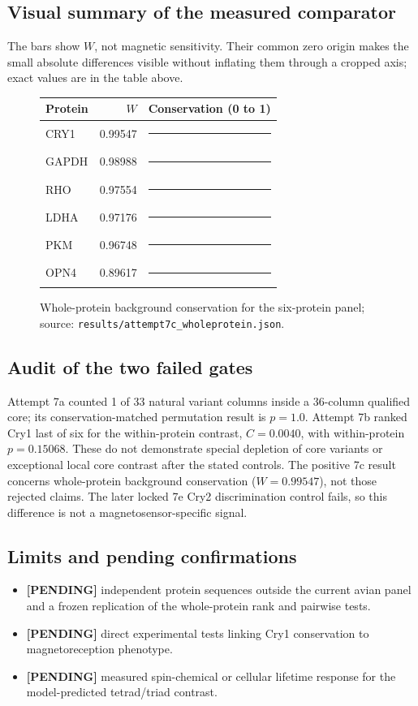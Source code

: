 \subsection{Visual summary of the measured comparator}
The bars show $W$, not magnetic sensitivity. Their common zero origin makes the small absolute differences visible without inflating them through a cropped axis; exact values are in the table above.
\begin{figure}[ht]\centering\small\begin{tabular}{lr l}\hline Protein & $W$ & Conservation (0 to 1) \\\hline
CRY1 & 0.99547 & \textcolor{paperblue}{\rule{7.27cm}{5pt}} \\
GAPDH & 0.98988 & \textcolor{black}{\rule{7.23cm}{5pt}} \\
RHO & 0.97554 & \textcolor{black}{\rule{7.12cm}{5pt}} \\
LDHA & 0.97176 & \textcolor{black}{\rule{7.09cm}{5pt}} \\
PKM & 0.96748 & \textcolor{black}{\rule{7.06cm}{5pt}} \\
OPN4 & 0.89617 & \textcolor{black}{\rule{6.54cm}{5pt}} \\
\hline\end{tabular}\caption{Whole-protein background conservation for the six-protein panel; source: \texttt{results/attempt7c\_wholeprotein.json}.}\end{figure}
\subsection{Audit of the two failed gates}
Attempt 7a counted 1 of 33 natural variant columns inside a 36-column qualified core; its conservation-matched permutation result is $p=1.0$. Attempt 7b ranked Cry1 last of six for the within-protein contrast, $C=0.0040$, with within-protein $p=0.15068$. These do not demonstrate special depletion of core variants or exceptional local core contrast after the stated controls. The positive 7c result concerns whole-protein background conservation ($W=0.99547$), not those rejected claims. The later locked 7e Cry2 discrimination control fails, so this difference is not a magnetosensor-specific signal.
\subsection{Limits and pending confirmations}
\begin{itemize}
\item \textbf{[PENDING]} independent protein sequences outside the current avian panel and a frozen replication of the whole-protein rank and pairwise tests.
\item \textbf{[PENDING]} direct experimental tests linking Cry1 conservation to magnetoreception phenotype.
\item \textbf{[PENDING]} measured spin-chemical or cellular lifetime response for the model-predicted tetrad/triad contrast.
\end{itemize}
